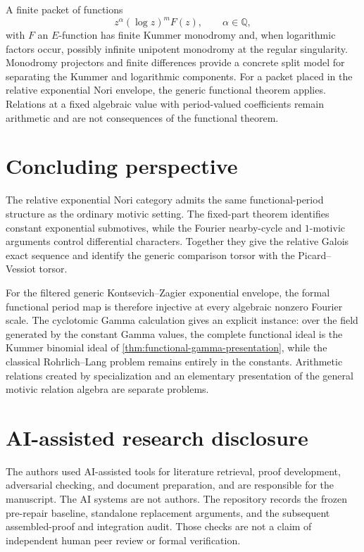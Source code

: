 \documentclass[11pt]{article}
\numberwithin{equation}{section}
\theoremstyle{definition}
\theoremstyle{remark}
\newcommand{\Q}{\mathbb Q}
\begin{document}
A finite packet of functions
\[
  z^\alpha(\log z)^mF(z),
  \qquad \alpha\in\Q,
\]
with $F$ an $E$-function has finite Kummer monodromy and, when logarithmic factors occur,
possibly infinite unipotent monodromy at the regular singularity.  Monodromy projectors and finite differences provide a concrete
split model for separating the Kummer and logarithmic components.  For a packet placed in the relative exponential Nori envelope, the generic
functional theorem applies.  Relations at a fixed algebraic value with
period-valued coefficients remain arithmetic and are not consequences of the
functional theorem.

\section{Concluding perspective}

The relative exponential Nori category admits the same functional-period
structure as the ordinary motivic setting.  The fixed-part theorem identifies
constant exponential submotives, while the Fourier nearby-cycle and
$1$-motivic arguments control differential characters.  Together they give the
relative Galois exact sequence and identify the generic comparison torsor with
the Picard--Vessiot torsor.

For the filtered generic Kontsevich--Zagier exponential envelope, the formal
functional period map is therefore injective at every algebraic nonzero
Fourier scale.  The cyclotomic Gamma calculation gives an explicit instance:
over the field generated by the constant Gamma values, the complete functional
ideal is the Kummer binomial ideal of
\cref{thm:functional-gamma-presentation}, while the classical
Rohrlich--Lang problem remains entirely in the constants.  Arithmetic relations
created by specialization and an elementary presentation of the general motivic
relation algebra are separate problems.

\section*{AI-assisted research disclosure}
The authors used AI-assisted tools for literature retrieval, proof development,
adversarial checking, and document preparation, and are responsible for the
manuscript. The AI systems are not authors. The repository records the frozen
pre-repair baseline, standalone replacement arguments, and the subsequent
assembled-proof and integration audit. Those checks are not a claim of
independent human peer review or formal verification.
\end{document}
